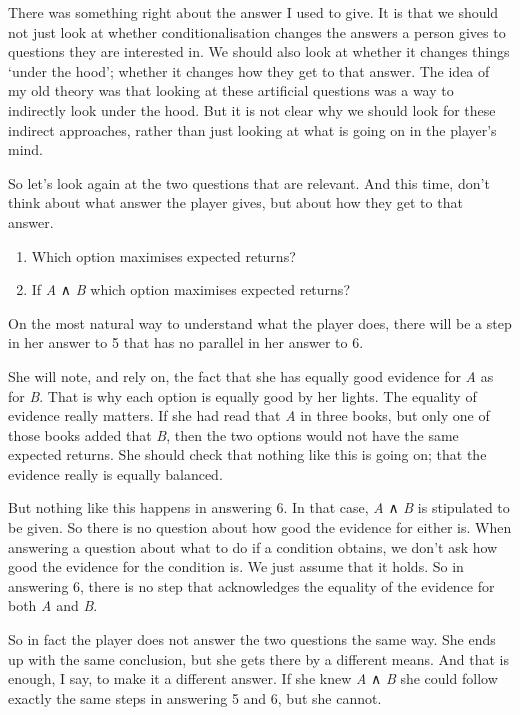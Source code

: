 \documentclass[
  11pt,
]{book}
\providecommand{\tightlist}{%
  \setlength{\itemsep}{0pt}\setlength{\parskip}{0pt}}
\begin{document}
There was something right about the answer I used to give. It is that we should not just look at whether conditionalisation changes the answers a person gives to questions they are interested in. We should also look at whether it changes things `under the hood'; whether it changes how they get to that answer. The idea of my old theory was that looking at these artificial questions was a way to indirectly look under the hood. But it is not clear why we should look for these indirect approaches, rather than just looking at what is going on in the player's mind.

So let's look again at the two questions that are relevant. And this time, don't think about what answer the player gives, but about how they get to that answer.

\begin{enumerate}
\def\labelenumi{\arabic{enumi}.}
\setcounter{enumi}{4}
\tightlist
\item
  Which option maximises expected returns?
\item
  If \emph{A} ∧ \emph{B} which option maximises expected returns?
\end{enumerate}

On the most natural way to understand what the player does, there will be a step in her answer to 5 that has no parallel in her answer to 6.

She will note, and rely on, the fact that she has equally good evidence for \emph{A} as for \emph{B}. That is why each option is equally good by her lights. The equality of evidence really matters. If she had read that \emph{A} in three books, but only one of those books added that \emph{B}, then the two options would not have the same expected returns. She should check that nothing like this is going on; that the evidence really is equally balanced.

But nothing like this happens in answering 6. In that case, \emph{A} ∧ \emph{B} is stipulated to be given. So there is no question about how good the evidence for either is. When answering a question about what to do if a condition obtains, we don't ask how good the evidence for the condition is. We just assume that it holds. So in answering 6, there is no step that acknowledges the equality of the evidence for both \emph{A} and \emph{B}.

So in fact the player does not answer the two questions the same way. She ends up with the same conclusion, but she gets there by a different means. And that is enough, I say, to make it a different answer. If she knew \emph{A} ∧ \emph{B} she could follow exactly the same steps in answering 5 and 6, but she cannot.
\end{document}
